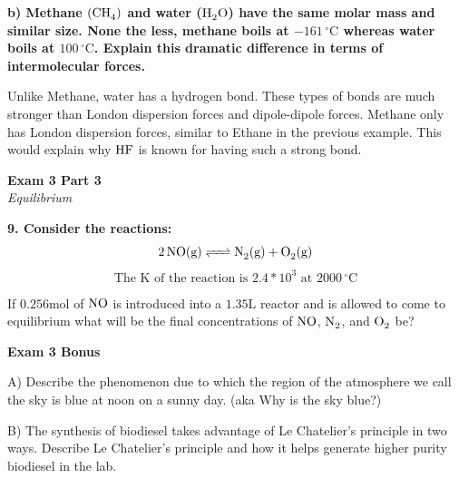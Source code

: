 \documentclass{article}
\begin{document}
    \textbf{b) Methane $(\ce{CH4})$ and water ($\ce{H2O}$) have the same molar mass and similar size. None the less, methane boils at $-161\,^{\circ}\mathrm{C}$  whereas water boils at $100\,^{\circ}\mathrm{C}$. Explain this  dramatic difference in terms of intermolecular forces.}

    Unlike Methane, water has a hydrogen bond. These types of bonds are much stronger than London dispersion forces and dipole-dipole forces. Methane only has London dispersion forces, similar to Ethane in the previous example. This would explain why $\ce{HF}$ is known for having such a strong bond.
    \pagebreak

    \begin{center}
        \textbf{Exam 3 Part 3}\\
        \textit{Equilibrium}
    \end{center}
    \textbf{9. Consider the reactions:}
    $$ \ce{2NO} (\si{\gram}) \ce{<=>} \ce{N2}(\si{\gram}) + \ce{O2}(\si{\gram})$$
    $$\text{The K of the reaction is } 2.4*10^{3} \text{ at }  2000\,^{\circ}\mathrm{C}$$

    If $0.256 \si{\mole}$ of $\ce{NO}$ is introduced into a $1.35 \si{\liter}$ reactor and is allowed to come to equilibrium what will be the final concentrations of $\ce{NO }$, $\ce{N2}$, and $\ce{O2}$ be?

    \pagebreak

    \begin{center}
        \textbf{Exam 3 Bonus}\\
    \end{center}

    A) Describe the phenomenon due to which the region of the atmosphere we call the sky is blue at noon on a sunny day. (aka Why is the sky blue?)

    B) The synthesis of biodiesel takes advantage of Le Chatelier's principle in two ways. Describe Le Chatelier's principle and how it helps generate higher purity biodiesel in the lab.

\end{document}
